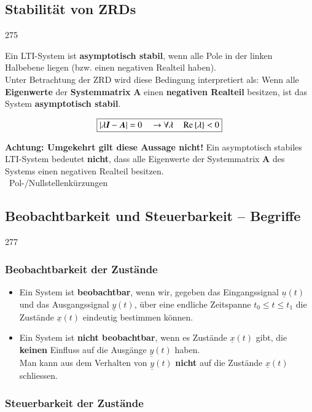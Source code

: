 \subsection{Stabilität von ZRDs}{275}

Ein LTI-System ist \textbf{asymptotisch stabil}, wenn alle Pole in der linken Halbebene liegen (bzw. einen negativen Realteil haben). \\
Unter Betrachtung der ZRD wird diese Bedingung interpretiert als:
Wenn alle \textbf{Eigenwerte} der \textbf{Systemmatrix} $\bm{A}$ einen \textbf{negativen Realteil} besitzen, ist das System 
\textbf{asymptotisch stabil}.

$$ \boxed{ \left|\lambda \bm{I} - \bm{A}\right|  = 0 \quad \rightarrow \forall \lambda \quad \operatorname{Re}\left\{\lambda\right\} < 0 }  $$

\textbf{Achtung: Umgekehrt gilt diese Aussage nicht!} Ein asymptotisch stabiles LTI-System bedeutet \textbf{nicht}, 
dass alle Eigenwerte der Systemmatrix $\bm{A}$ des Systems einen negativen Realteil besitzen. \\
\textrightarrow\ Pol-/Nullstellenkürzungen


\subsection{Beobachtbarkeit und Steuerbarkeit -- Begriffe}{277}

\subsubsection*{Beobachtbarkeit der Zustände}

\begin{itemize}
    \item Ein System ist \textbf{beobachtbar}, wenn wir, gegeben das Eingangssignal $\underline{u}(t)$ und das Ausgangssignal $\underline{y}(t)$,
        über eine endliche Zeitspanne $t_0 \leq t \leq t_1$ die Zustände $\underline{x}(t)$ eindeutig bestimmen können. 
    \item Ein System ist \textbf{nicht beobachtbar}, wenn es Zustände $\underline{x}(t)$ gibt, die \textbf{keinen} Einfluss
        auf die Ausgänge $\underline{y}(t)$ haben. \\   
        \textrightarrow Man kann aus dem Verhalten von $\underline{y}(t)$ \textbf{nicht} auf die Zustände $\underline{x}(t)$ schliessen.
\end{itemize}


\subsubsection*{Steuerbarkeit der Zustände}

